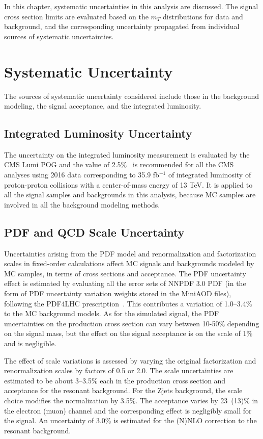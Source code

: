 In this chapter, systematic uncertainties in this analysis are discussed. The signal cross section limits are evaluated based on the $m_T$ distributions for data and background, and the corresponding uncertainty propagated from individual sources of systematic uncertainties.
\section{Systematic Uncertainty}
The sources of systematic uncertainty considered include those in the background modeling, the signal acceptance, and the integrated luminosity.
\subsection{Integrated Luminosity Uncertainty}
The uncertainty on the integrated luminosity measurement is evaluated by the CMS Lumi POG and the value of 2.5\%~\cite{sys_lumi} is recommended for all the CMS analyses using 2016 data corresponding to 35.9 fb$^{-1}$ of integrated luminosity of proton-proton collisions with a center-of-mass energy of 13 TeV. It is applied to all the signal samples and backgrounds in this analysis, because MC samples are involved in all the background modeling methods.
\subsection{PDF and QCD Scale Uncertainty}
Uncertainties arising from the PDF model and renormalization and factorization scales in fixed-order calculations affect MC signals and backgrounds modeled by MC samples, in terms of cross sections and acceptance. The PDF uncertainty effect is estimated by evaluating all the error sets of NNPDF 3.0 PDF (in the form of PDF uncertainty variation weights stored in the MiniAOD files), following the PDF4LHC prescription~\cite{sample_pdf4lhc}. This contributes a variation of 1.0--3.4\% to the MC background models. As for the simulated signal, the PDF uncertainties on the production cross section can vary between 10-50\% depending on the signal mass, but the effect on the signal acceptance is on the scale of 1\% and is negligible.

\vspace{0.3cm}
The effect of scale variations is assessed by varying the original factorization and renormalization scales by factors of 0.5 or 2.0. The scale uncertainties are estimated to be about 3--3.5\% each in the production cross section and acceptance for the resonant background. For the Zjets background, the scale choice modifies the normalization by 3.5\%. The acceptance varies by 23~(13)\% in the electron (muon) channel and the corresponding effect is negligibly small for the signal.  An uncertainty of 3.0\% is estimated for the (N)NLO correction to the resonant background.

